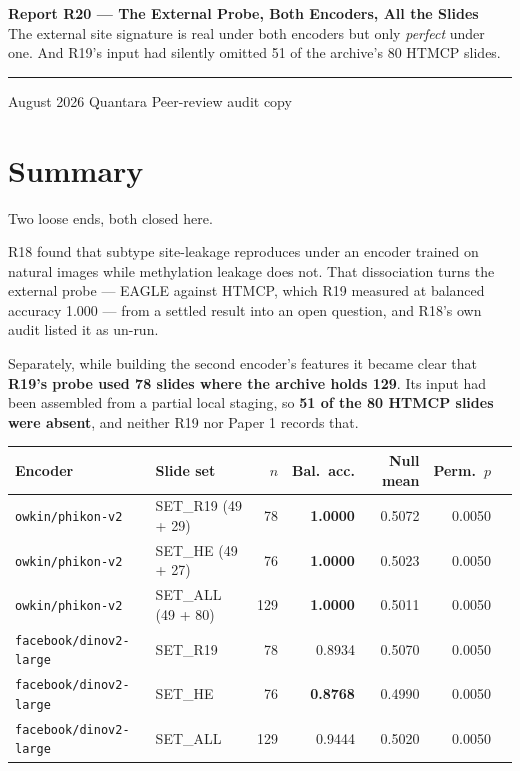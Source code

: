 \documentclass[11pt,a4paper]{article}
\begin{document}
\thispagestyle{empty}
\noindent
{\large\bfseries\color{qnavy} Report R20 --- The External Probe, Both Encoders, All the Slides}\\[2pt]
{\color{qgrey}The external site signature is real under both encoders but only \emph{perfect} under
one. And R19's input had silently omitted 51 of the archive's 80 HTMCP slides.}\\[6pt]
{\color{qgrey}\rule{\textwidth}{0.4pt}}

\medskip
{} August 2026 \quad\textbullet\quad Quantara \quad\textbullet\quad
{\color{qgrey}Peer-review audit copy}

\section*{Summary}

Two loose ends, both closed here.

R18 found that subtype site-leakage reproduces under an encoder trained on natural images while
methylation leakage does not. That dissociation turns the external probe --- EAGLE against HTMCP,
which R19 measured at balanced accuracy 1.000 --- from a settled result into an open question, and
R18's own audit listed it as un-run.

Separately, while building the second encoder's features it became clear that \textbf{R19's probe
used 78 slides where the archive holds 129}. Its input had been assembled from a partial local
staging, so \textbf{51 of the 80 HTMCP slides were absent}, and neither R19 nor Paper 1 records
that.

\begin{center}
\begin{tabular}{@{}llrrrrl@{}}
\toprule
\textbf{Encoder} & \textbf{Slide set} & \textbf{$n$} & \textbf{Bal.\ acc.} &
\textbf{Null mean} & \textbf{Perm.\ $p$} \\
\midrule
\texttt{owkin/phikon-v2} & SET\_R19 (49 + 29) & 78 & \textbf{1.0000} & 0.5072 & 0.0050 \\
\texttt{owkin/phikon-v2} & SET\_HE (49 + 27) & 76 & \textbf{1.0000} & 0.5023 & 0.0050 \\
\texttt{owkin/phikon-v2} & SET\_ALL (49 + 80) & 129 & \textbf{1.0000} & 0.5011 & 0.0050 \\
\midrule
\texttt{facebook/dinov2-large} & SET\_R19 & 78 & 0.8934 & 0.5070 & 0.0050 \\
\texttt{facebook/dinov2-large} & SET\_HE & 76 & \textbf{0.8768} & 0.4990 & 0.0050 \\
\texttt{facebook/dinov2-large} & SET\_ALL & 129 & 0.9444 & 0.5020 & 0.0050 \\
\bottomrule
\end{tabular}
\end{center}
\end{document}
